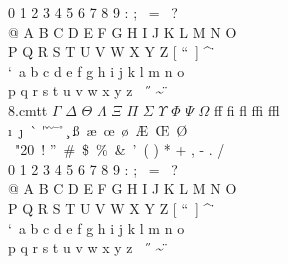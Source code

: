 \documentclass{article}
\begin{document}
0 1 2 3 4 5 6 7 8 9 : ; \textexclamdown\ = \textquestiondown\ ?\\
@ A B C D E F G H I J K L M N O\\
P Q R S T U V W X Y Z [ \textquotedblleft\ ] \^{} \.{} \\
\textquoteleft\ a b c d e f g h i j k l m n o\\
p q r s t u v w x y z \textendash\ \textemdash\ \H{} \~{} \"{}\\
8.cmtt
\noindent $\Gamma$ $\Delta$ $\Theta$ $\Lambda$ $\Xi$ $\Pi$ $\Sigma$ $\Upsilon$ $\Phi$ $\Psi$ $\Omega$ ff fi fl ffi ffl\\
\i\ \j\ \`{} \'{} \v{} \u{} \={} \r{} \c{} \ss\ \ae\ \oe\ \o\ \AE\ \OE\ \O\\\
\selectfont\char"20\ ! \textquotedblright\ \#\ \$\ \%\ \&\ \textquoteright\ ( ) * + , - . /\\
0 1 2 3 4 5 6 7 8 9 : ; \textexclamdown\ = \textquestiondown\ ?\\
@ A B C D E F G H I J K L M N O\\
P Q R S T U V W X Y Z [ \textquotedblleft\ ] \^{} \.{} \\
\textquoteleft\ a b c d e f g h i j k l m n o\\
p q r s t u v w x y z \textendash\ \textemdash\ \H{} \~{} \"{}\\
\end{document}
